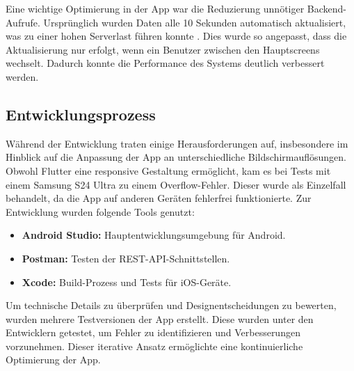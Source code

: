 Eine wichtige Optimierung in der App war die Reduzierung unnötiger Backend-Aufrufe. Ursprünglich 
wurden Daten alle 10 Sekunden automatisch aktualisiert, was zu einer hohen Serverlast führen konnte
. Dies wurde so angepasst, dass die Aktualisierung nur erfolgt, wenn ein Benutzer zwischen den 
Hauptscreens wechselt. Dadurch konnte die Performance des Systems deutlich verbessert werden.

\subsection{Entwicklungsprozess}
Während der Entwicklung traten einige Herausforderungen auf, insbesondere im Hinblick auf die 
Anpassung der App an unterschiedliche Bildschirmauflösungen. Obwohl Flutter eine responsive 
Gestaltung ermöglicht, kam es bei Tests mit einem Samsung S24 Ultra zu einem Overflow-Fehler. 
Dieser wurde als Einzelfall behandelt, da die App auf anderen Geräten fehlerfrei funktionierte. 
Zur Entwicklung wurden folgende Tools genutzt:

\begin{itemize}
    \item \textbf{Android Studio:} Hauptentwicklungsumgebung für Android.
    \item \textbf{Postman:} Testen der REST-API-Schnittstellen.
    \item \textbf{Xcode:} Build-Prozess und Tests für iOS-Geräte.
\end{itemize}

Um technische Details zu überprüfen und Designentscheidungen zu bewerten, wurden mehrere 
Testversionen der App erstellt. Diese wurden unter den Entwicklern getestet, um Fehler zu 
identifizieren und Verbesserungen vorzunehmen. Dieser iterative Ansatz ermöglichte eine 
kontinuierliche Optimierung der App.

